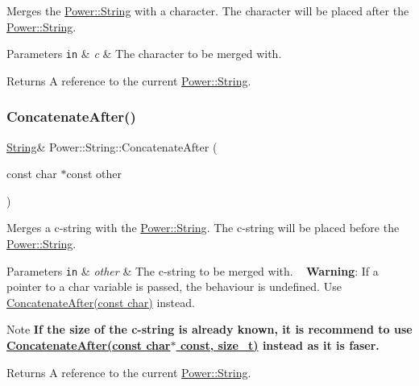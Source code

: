 Merges the \hyperlink{class_power_1_1_string}{Power\+::\+String} with a character. The character will be placed after the \hyperlink{class_power_1_1_string}{Power\+::\+String}. 


\begin{DoxyParams}[1]{Parameters}
\mbox{\tt in}  & {\em c} & The character to be merged with. \\
\hline
\end{DoxyParams}
\begin{DoxyReturn}{Returns}
A reference to the current \hyperlink{class_power_1_1_string}{Power\+::\+String}. 
\end{DoxyReturn}
\mbox{\label{class_power_1_1_string_a107898ce266986aba29ec9464539a8f8}} 
\subsubsection{\texorpdfstring{Concatenate\+After()}{ConcatenateAfter()}\hspace{0.1cm}{\footnotesize\ttfamily [1/3]}}
{\footnotesize\ttfamily \hyperlink{class_power_1_1_string}{String}\& Power\+::\+String\+::\+Concatenate\+After (\begin{DoxyParamCaption}\item[{const char $\ast$const}]{other }\end{DoxyParamCaption})\hspace{0.3cm}{\ttfamily [inline]}}



Merges a c-\/string with the \hyperlink{class_power_1_1_string}{Power\+::\+String}. The c-\/string will be placed before the \hyperlink{class_power_1_1_string}{Power\+::\+String}. 


\begin{DoxyParams}[1]{Parameters}
\mbox{\tt in}  & {\em other} & The c-\/string to be merged with. ~\newline
 {\bfseries Warning}\+: If a pointer to a char variable is passed, the behaviour is undefined. Use \hyperlink{class_power_1_1_string_abd905989e4b22a1e203e5aec05eec828}{Concatenate\+After(const char)} instead. \\
\hline
\end{DoxyParams}
\begin{DoxyNote}{Note}
{\bfseries If the size of the c-\/string is already known, it is recommend to use \hyperlink{class_power_1_1_string_aa737e905780b2712166e9c2decbc4f38}{Concatenate\+After(const char$\ast$ const, size\+\_\+t)} instead as it is faser.} 
\end{DoxyNote}
\begin{DoxyReturn}{Returns}
A reference to the current \hyperlink{class_power_1_1_string}{Power\+::\+String}. 
\end{DoxyReturn}
\mbox{\label{class_power_1_1_string_aa737e905780b2712166e9c2decbc4f38}} 
